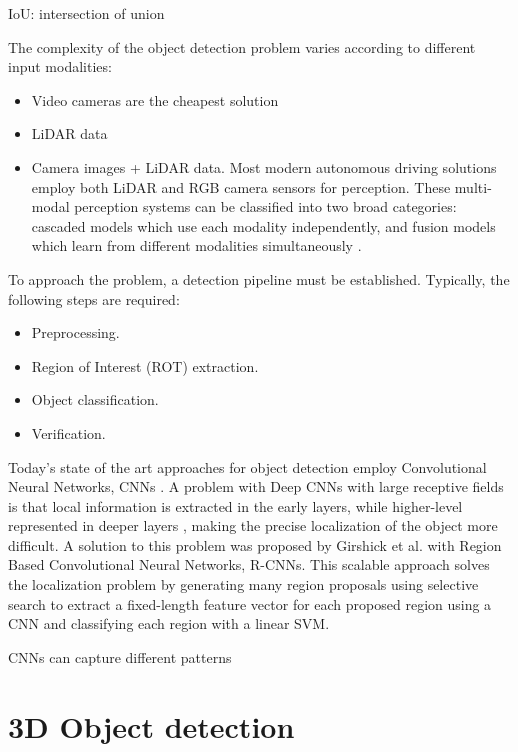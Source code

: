 IoU: intersection of union

The complexity of the object detection problem varies according to different input modalities:
\begin{itemize}
    \item Video cameras are the cheapest solution
    \item LiDAR data 
    \item Camera images + LiDAR data. Most modern autonomous driving solutions employ both LiDAR and RGB camera sensors for perception. These multi-modal perception systems can be classified into two broad categories: cascaded models which use each modality independently, and fusion models which learn from different modalities simultaneously \cite{DBLP:conf/iros/AbdelfattahY0W21}.
\end{itemize}

To approach the problem, a detection pipeline must be established. Typically, the following steps are required:
\begin{itemize}
    \item Preprocessing.
    \item Region of Interest (ROT) extraction.
    \item Object classification.
    \item Verification.
\end{itemize}

Today's state of the art approaches for object detection employ Convolutional Neural Networks, CNNs \cite{DBLP:conf/eccv/CaiFFV16} \cite{DBLP:journals/pami/ChenKZMFU18}.
A problem with Deep CNNs with large receptive fields is that local information is extracted in the early layers, while higher-level represented in deeper layers \cite{DBLP:journals/ftcgv/JanaiGBG20}, making the precise localization of the object more difficult.
A solution to this problem was proposed by Girshick et al. \cite{DBLP:conf/cvpr/GirshickDDM14} with Region Based Convolutional Neural Networks, R-CNNs. This scalable approach solves the localization problem by generating many region proposals using selective search \cite{DBLP:journals/ijcv/UijlingsSGS13} to extract a fixed-length feature vector for each proposed region using a CNN and classifying each region with a linear SVM.




CNNs can capture different patterns 


\newpage
\section{3D Object detection}

